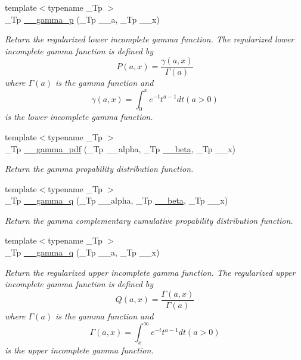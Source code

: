 \begin{DoxyCompactItemize}
{\footnotesize template$<$typename \+\_\+\+Tp $>$ }\\\+\_\+\+Tp \hyperlink{namespacestd_1_1____detail_a4583981bd73c3d3bba970c2f91dc4ba5}{\+\_\+\+\_\+gamma\+\_\+p} (\+\_\+\+Tp \+\_\+\+\_\+a, \+\_\+\+Tp \+\_\+\+\_\+x)
\begin{DoxyCompactList}\small\item\em Return the regularized lower incomplete gamma function. The regularized lower incomplete gamma function is defined by \[ P(a,x) = \frac{\gamma(a,x)}{\Gamma(a)} \] where $ \Gamma(a) $ is the gamma function and \[ \gamma(a,x) = \int_0^x e^{-t}t^{a-1}dt (a > 0) \] is the lower incomplete gamma function. \end{DoxyCompactList}\item 
{\footnotesize template$<$typename \+\_\+\+Tp $>$ }\\\+\_\+\+Tp \hyperlink{namespacestd_1_1____detail_a13146321e4e094815de990c33b83b02a}{\+\_\+\+\_\+gamma\+\_\+pdf} (\+\_\+\+Tp \+\_\+\+\_\+alpha, \+\_\+\+Tp \hyperlink{namespacestd_1_1____detail_a090d2f0920e0d208c467609b2a81d717}{\+\_\+\+\_\+beta}, \+\_\+\+Tp \+\_\+\+\_\+x)
\begin{DoxyCompactList}\small\item\em Return the gamma propability distribution function. \end{DoxyCompactList}\item 
{\footnotesize template$<$typename \+\_\+\+Tp $>$ }\\\+\_\+\+Tp \hyperlink{namespacestd_1_1____detail_ad979441c8b26be7cfddb93db911743eb}{\+\_\+\+\_\+gamma\+\_\+q} (\+\_\+\+Tp \+\_\+\+\_\+alpha, \+\_\+\+Tp \hyperlink{namespacestd_1_1____detail_a090d2f0920e0d208c467609b2a81d717}{\+\_\+\+\_\+beta}, \+\_\+\+Tp \+\_\+\+\_\+x)
\begin{DoxyCompactList}\small\item\em Return the gamma complementary cumulative propability distribution function. \end{DoxyCompactList}\item 
{\footnotesize template$<$typename \+\_\+\+Tp $>$ }\\\+\_\+\+Tp \hyperlink{namespacestd_1_1____detail_a0ac19486073d0a7b2dc923b45b26777c}{\+\_\+\+\_\+gamma\+\_\+q} (\+\_\+\+Tp \+\_\+\+\_\+a, \+\_\+\+Tp \+\_\+\+\_\+x)
\begin{DoxyCompactList}\small\item\em Return the regularized upper incomplete gamma function. The regularized upper incomplete gamma function is defined by \[ Q(a,x) = \frac{\Gamma(a,x)}{\Gamma(a)} \] where $ \Gamma(a) $ is the gamma function and \[ \Gamma(a,x) = \int_x^\infty e^{-t}t^{a-1}dt (a > 0) \] is the upper incomplete gamma function. \end{DoxyCompactList}\item 

\end{DoxyCompactItemize}
